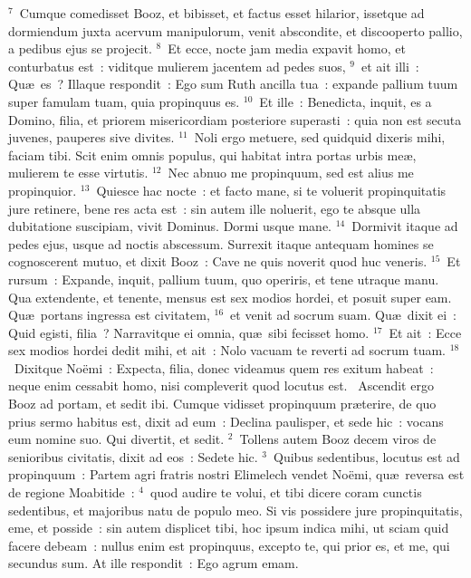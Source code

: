 ${}^{7}$~Cumque comedisset Booz, et bibisset, et factus esset hilarior, issetque ad dormiendum juxta acervum manipulorum, venit abscondite, et discooperto pallio, a pedibus ejus se projecit.
${}^{8}$~Et ecce, nocte jam media expavit homo, et conturbatus est~: viditque mulierem jacentem ad pedes suos,
${}^{9}$~et ait illi~: Qu\ae\ es~? Illaque respondit~: Ego sum Ruth ancilla tua~: expande pallium tuum super famulam tuam, quia propinquus es.
${}^{10}$~Et ille~: Benedicta, inquit, es a Domino, filia, et priorem misericordiam posteriore superasti~: quia non est secuta juvenes, pauperes sive divites.
${}^{11}$~Noli ergo metuere, sed quidquid dixeris mihi, faciam tibi. Scit enim omnis populus, qui habitat intra portas urbis me\ae , mulierem te esse virtutis.
${}^{12}$~Nec abnuo me propinquum, sed est alius me propinquior.
${}^{13}$~Quiesce hac nocte~: et facto mane, si te voluerit propinquitatis jure retinere, bene res acta est~: sin autem ille noluerit, ego te absque ulla dubitatione suscipiam, vivit Dominus. Dormi usque mane.
${}^{14}$~Dormivit itaque ad pedes ejus, usque ad noctis abscessum. Surrexit itaque antequam homines se cognoscerent mutuo, et dixit Booz~: Cave ne quis noverit quod huc veneris.
${}^{15}$~Et rursum~: Expande, inquit, pallium tuum, quo operiris, et tene utraque manu. Qua extendente, et tenente, mensus est sex modios hordei, et posuit super eam. Qu\ae\ portans ingressa est civitatem,
${}^{16}$~et venit ad socrum suam. Qu\ae\ dixit ei~: Quid egisti, filia~? Narravitque ei omnia, qu\ae\ sibi fecisset homo.
${}^{17}$~Et ait~: Ecce sex modios hordei dedit mihi, et ait~: Nolo vacuam te reverti ad socrum tuam.
${}^{18}$~Dixitque No\"emi~: Expecta, filia, donec videamus quem res exitum habeat~: neque enim cessabit homo, nisi compleverit quod locutus est.
~\lettrine[lines=10,image=true,loversize=0.05,lraise=-0.03]{A}{}scendit ergo Booz ad portam, et sedit ibi. Cumque vidisset propinquum pr\ae terire, de quo prius sermo habitus est, dixit ad eum~: Declina paulisper, et sede hic~: vocans eum nomine suo. Qui divertit, et sedit.
${}^{2}$~Tollens autem Booz decem viros de senioribus civitatis, dixit ad eos~: Sedete hic.
${}^{3}$~Quibus sedentibus, locutus est ad propinquum~: Partem agri fratris nostri Elimelech vendet No\"emi, qu\ae\ reversa est de regione Moabitide~:
${}^{4}$~quod audire te volui, et tibi dicere coram cunctis sedentibus, et majoribus natu de populo meo. Si vis possidere jure propinquitatis, eme, et posside~: sin autem displicet tibi, hoc ipsum indica mihi, ut sciam quid facere debeam~: nullus enim est propinquus, excepto te, qui prior es, et me, qui secundus sum. At ille respondit~: Ego agrum emam.
